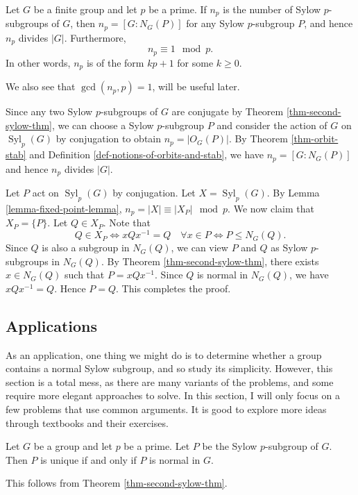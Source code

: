 \begin{theorem} \label{thm-third-sylow-thm}
	Let $G$ be a finite group and let $p$ be a prime. If $n_p$ is the number of Sylow $p$-subgroups of $G$, then $n_p = [G:N_G(P)]$ for any Sylow $p$-subgroup $P$, and hence  $n_p $ divides $|G|$. Furthermore, $$n_p \equiv 1 \mod p.$$ In other words, $n_p$ is of the form $kp+1$ for some $k\geq 0$.
\end{theorem}
\begin{remark}
	We also see that $\gcd(n_p, p) = 1$, will be useful later.
\end{remark}
\begin{sketch}
	Since any two Sylow $p$-subgroups of $G$ are conjugate by Theorem \ref{thm-second-sylow-thm}, we can choose a Sylow $p$-subgroup $P$ and consider the action of $G$ on $\operatorname{Syl}_p(G)$ by conjugation to obtain $n_p = |O_G(P)|$. By Theorem \ref{thm-orbit-stab} and  Definition  \ref{def-notions-of-orbits-and-stab}, we have $n_p = [G:N_G(P)]$ and hence $n_p$ divides $|G|$.
	
	Let $P$ act on $\operatorname{Syl}_p(G)$ by conjugation. Let $X = \operatorname{Syl}_p(G)$. By Lemma \ref{lemma-fixed-point-lemma}, $n_p =|X| \equiv |X_P|\mod p$. We now claim that $X_P  =\{P\}$. Let $Q\in X_P$. Note that
	$$Q\in X_P\iff xQx^{-1} = Q \quad\forall x\in P \iff P\leq N_G(Q).$$
	Since $Q$ is also a subgroup in $N_G(Q)$, we can view $P$ and $Q$ as Sylow $p$-subgroups in $N_G(Q)$. By Theorem \ref{thm-second-sylow-thm}, there exists $x\in N_G(Q)$ such that $P = xQx^{-1}$. Since $Q$ is normal in $N_G(Q)$, we have $xQx^{-1}=Q$. Hence $P=Q$. This completes the proof.
\end{sketch}



\subsection{Applications}
As an application, one thing we might do is to determine whether a group contains a normal Sylow subgroup, and so study its simplicity. However, this section is a total mess, as there are many variants of the problems, and some require more elegant approaches to solve. In this section, I will only focus on a few problems that use common arguments. It is good to explore more ideas through textbooks and their exercises.
\begin{corollary} \label{cor-one-sylow-p-implies-normal}
	Let $G$ be a group and let $p$ be a prime. Let $P$ be the Sylow $p$-subgroup of $G$. Then  $P$ is unique if and only if $P$ is normal in $G$.
\end{corollary}
\begin{sketch}
	This follows from Theorem \ref{thm-second-sylow-thm}.
\end{sketch}

